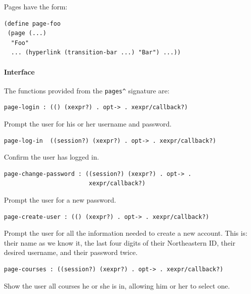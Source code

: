 \documentclass[a4paper]{article}
\begin{document}
Pages have the form:

\begin{verbatim}
(define page-foo 
 (page (...)
  "Foo"
  ... (hyperlink (transition-bar ...) "Bar") ...))
\end{verbatim}

\paragraph{Interface}\label{para:pages-interface}

The functions provided from the \verb|pages^| signature are:

\begin{verbatim}
page-login : (() (xexpr?) . opt-> . xexpr/callback?)
\end{verbatim}
Prompt the user for his or her username and password.

\begin{verbatim}
page-log-in  ((session?) (xexpr?) . opt-> . xexpr/callback?)
\end{verbatim}
Confirm the user has logged in.



\begin{verbatim}
page-change-password : ((session?) (xexpr?) . opt-> . 
                        xexpr/callback?)
\end{verbatim}
Prompt the user for a new password.

\begin{verbatim}
page-create-user : (() (xexpr?) . opt-> . xexpr/callback?)
\end{verbatim}
Prompt the user for all the information needed to create a
new account. This is: their name as we know it, the last
four digits of their Northeastern ID, their desired username,
and their password twice.

\begin{verbatim}
page-courses : ((session?) (xexpr?) . opt-> . xexpr/callback?)
\end{verbatim}
Show the user all courses he or she is in, allowing him or her to select one.
\end{document}
